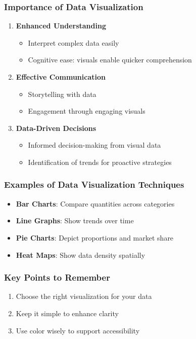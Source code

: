 \documentclass[aspectratio=169]{beamer}
\begin{document}
\begin{frame}[fragile]
    \frametitle{Importance of Data Visualization}
    \begin{enumerate}
        \item \textbf{Enhanced Understanding}
            \begin{itemize}
                \item Interpret complex data easily
                \item Cognitive ease: visuals enable quicker comprehension
            \end{itemize}
        \item \textbf{Effective Communication}
            \begin{itemize}
                \item Storytelling with data
                \item Engagement through engaging visuals
            \end{itemize}
        \item \textbf{Data-Driven Decisions}
            \begin{itemize}
                \item Informed decision-making from visual data
                \item Identification of trends for proactive strategies
            \end{itemize}
    \end{enumerate}
\end{frame}

\begin{frame}[fragile]
    \frametitle{Examples of Data Visualization Techniques}
    \begin{itemize}
        \item \textbf{Bar Charts}: Compare quantities across categories
        \item \textbf{Line Graphs}: Show trends over time
        \item \textbf{Pie Charts}: Depict proportions and market share
        \item \textbf{Heat Maps}: Show data density spatially
    \end{itemize}
\end{frame}

\begin{frame}[fragile]
    \frametitle{Key Points to Remember}
    \begin{enumerate}
        \item Choose the right visualization for your data
        \item Keep it simple to enhance clarity
        \item Use color wisely to support accessibility 
    \end{enumerate}
\end{frame}
\end{document}
